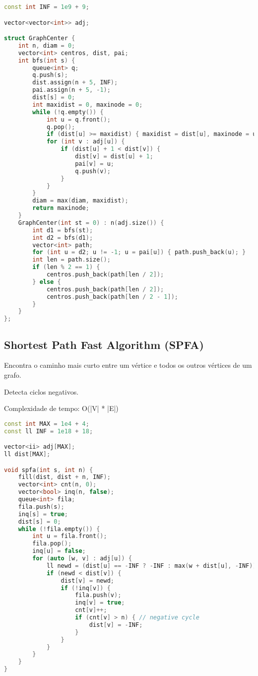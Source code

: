 \documentclass[11pt, a4paper, twoside]{article}
\begin{document}
\begin{lstlisting}[language=C++]
const int INF = 1e9 + 9;

vector<vector<int>> adj;

struct GraphCenter {
    int n, diam = 0;
    vector<int> centros, dist, pai;
    int bfs(int s) {
        queue<int> q;
        q.push(s);
        dist.assign(n + 5, INF);
        pai.assign(n + 5, -1);
        dist[s] = 0;
        int maxidist = 0, maxinode = 0;
        while (!q.empty()) {
            int u = q.front();
            q.pop();
            if (dist[u] >= maxidist) { maxidist = dist[u], maxinode = u; }
            for (int v : adj[u]) {
                if (dist[u] + 1 < dist[v]) {
                    dist[v] = dist[u] + 1;
                    pai[v] = u;
                    q.push(v);
                }
            }
        }
        diam = max(diam, maxidist);
        return maxinode;
    }
    GraphCenter(int st = 0) : n(adj.size()) {
        int d1 = bfs(st);
        int d2 = bfs(d1);
        vector<int> path;
        for (int u = d2; u != -1; u = pai[u]) { path.push_back(u); }
        int len = path.size();
        if (len % 2 == 1) {
            centros.push_back(path[len / 2]);
        } else {
            centros.push_back(path[len / 2]);
            centros.push_back(path[len / 2 - 1]);
        }
    }
};
\end{lstlisting}

\subsection{Shortest Path Fast Algorithm (SPFA)}


Encontra o caminho mais curto entre um vértice e todos os outros vértices de um grafo.

Detecta ciclos negativos.

Complexidade de tempo: O(|V| * |E|)

\begin{lstlisting}[language=C++]
const int MAX = 1e4 + 4;
const ll INF = 1e18 + 18;

vector<ii> adj[MAX];
ll dist[MAX];

void spfa(int s, int n) {
    fill(dist, dist + n, INF);
    vector<int> cnt(n, 0);
    vector<bool> inq(n, false);
    queue<int> fila;
    fila.push(s);
    inq[s] = true;
    dist[s] = 0;
    while (!fila.empty()) {
        int u = fila.front();
        fila.pop();
        inq[u] = false;
        for (auto [w, v] : adj[u]) {
            ll newd = (dist[u] == -INF ? -INF : max(w + dist[u], -INF));
            if (newd < dist[v]) {
                dist[v] = newd;
                if (!inq[v]) {
                    fila.push(v);
                    inq[v] = true;
                    cnt[v]++;
                    if (cnt[v] > n) { // negative cycle
                        dist[v] = -INF;
                    }
                }
            }
        }
    }
}
\end{lstlisting}
\end{document}
